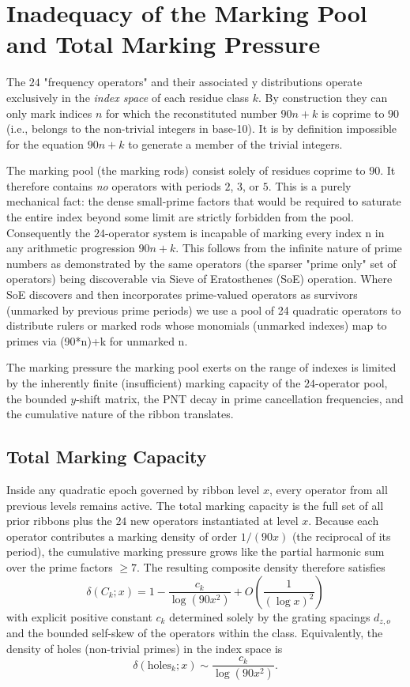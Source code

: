 \documentclass[11pt,a4paper]{article}
\begin{document}
{\section{Inadequacy of the Marking Pool and Total Marking Pressure}

The $24$ "frequency operators" and their associated y distributions operate exclusively in the \emph{index space} of each residue class \(k\). By construction they can only mark indices \(n\) for which the reconstituted number \(90n+k\) is coprime to $90$ (i.e., belongs to the non-trivial integers in base-10). It is by definition impossible for the equation \(90n+k\) to generate a member of the trivial integers.

The marking pool (the marking rods) consist solely of residues coprime to $90$. It therefore contains \emph{no} operators with periods $2$, $3$, or $5$. This is a purely mechanical fact: the dense small-prime factors that would be required to saturate the entire index beyond some limit are strictly forbidden from the pool. Consequently the $24$-operator system is incapable of marking every index n in any arithmetic progression $90n+k$. This follows from the infinite nature of prime numbers as demonstrated by the same operators (the sparser "prime only" set of operators) being discoverable via Sieve of Eratosthenes (SoE) operation. Where SoE discovers and then incorporates prime-valued operators as survivors (unmarked by previous prime periods) we use a pool of 24 quadratic operators to distribute rulers or marked rods whose monomials (unmarked indexes) map to primes via (90*n)+k for unmarked n.  

The marking pressure the marking pool exerts on the range of indexes is limited by the inherently finite (insufficient) marking capacity of the $24$-operator pool, the bounded $y$-shift matrix, the PNT decay in prime cancellation frequencies, and the cumulative nature of the ribbon translates.
\subsection{Total Marking Capacity}
Inside any quadratic epoch governed by ribbon level \(x\), every operator from all previous levels remains active. The total marking capacity is the full set of all prior ribbons plus the $24$ new operators instantiated at level \(x\). Because each operator contributes a marking density of order \(1/(90x)\) (the reciprocal of its period), the cumulative marking pressure grows like the partial harmonic sum over the prime factors \(\geq7\). The resulting composite density therefore satisfies
\[
\delta(C_k;x)=1-\frac{c_k}{\log(90x^2)}+O\left(\frac{1}{(\log x)^2}\right)
\]
with explicit positive constant \(c_k\) determined solely by the grating spacings \(d_{z,o}\) and the bounded self-skew of the operators within the class. Equivalently, the density of holes (non-trivial primes) in the index space is
\[
\delta(\text{holes}_k;x)\sim\frac{c_k}{\log(90x^2)}.
\]

}
\end{document}
